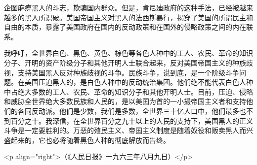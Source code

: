 企图麻痹黑人的斗志，欺骗国内群众。但是，肯尼廸政府的这种手法，已经被越来越多的黑人所识破。美国帝国主义对黑人的法西斯暴行，揭穿了美国的所谓民主和自由的本质，暴露了美国政府在国内的反动政策和在国外的侵略政策之间的内在联系。

我呼吁，全世界白色、黑色、黄色、棕色等各色人种中的工人、农民、革命的知识分子、开明的资产阶级分子和其他开明人士联合起来，反对美国帝国主义的种族歧视，支持美国黑人反对种族歧视的斗争。民族斗争，说到底，是一个阶级斗争问题。在美国压迫黑人的，是白色人种中的反动统治集团。他们绝不能代表白色人种中占绝大多数的工人、农民、革命的知识分子和其他开明人士。目前，压迫、侵略和威胁全世界绝大多数民族和人民的，是以美国为首的一小撮帝国主义者和支持他们的各同反动派。他们是少数，我们是多数，全世界三十亿人口中，他们最多也不到百分之十。我深信，在全世界百分之九十以上的人民的支持下，美国黑人的正义斗争是一定要胜利的。万恶的殖民主义、帝国主义制度是随着奴役和贩卖黑人而兴盛起来的，它也必将随着黑色人种的彻底解放而告终。

<p align="right">（《人民日报》一九六三年八月九日）</p>


